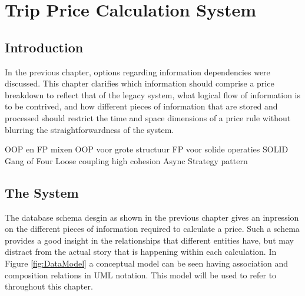 \graphicspath{{Chapter4/Figs/Vector/}{Chapter4/Figs/}}

%
\chapter{Trip Price Calculation System}
\section{Introduction}
In the previous chapter, options regarding information dependencies were discussed. This chapter clarifies which information should comprise a price breakdown to reflect that of the legacy system, what logical flow of information is to be contrived, and how different pieces of information that are stored and processed should restrict the time and space dimensions of a price rule without blurring the straightforwardness of the system.

OOP en FP mixen
OOP voor grote structuur
FP voor solide operaties
SOLID
Gang of Four
Loose coupling high cohesion
Async
Strategy pattern

%
\section{The System}
The database schema desgin as shown in the previous chapter gives an inpression on the different pieces of information required to calculate a price. Such a schema provides a good insight in the relationships that different entities have, but may distract from the actual story that is happening within each calculation. In Figure \ref{fig:DataModel} a conceptual model can be seen having association and composition relations in UML notation. This model will be used to refer to throughout this chapter.

